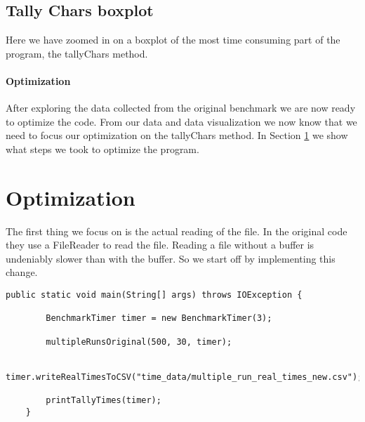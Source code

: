 \documentclass{article}
\begin{document}
\subsection*{Tally Chars boxplot}
Here we have zoomed in on a boxplot of the most time consuming part of the program, the tallyChars method. 


\paragraph{Optimization}
After exploring the data collected from the original benchmark we are now ready to optimize the code. 
From our data and data visualization we now know that we need to focus our optimization on the tallyChars method.
In Section \ref{optimization} we show what steps we took to optimize the program.

\section{Optimization} \label{optimization}
The first thing we focus on is the actual reading of the file. In the original code they use a FileReader to read the file.
Reading a file without a buffer is undeniably slower than with the buffer. So we start off by implementing this change. 

\begin{lstlisting}[caption={Change to BufferedReader}, label={lst:optimizationone}]
    public static void main(String[] args) throws IOException {
    
        BenchmarkTimer timer = new BenchmarkTimer(3);
    
        multipleRunsOriginal(500, 30, timer);
    
        timer.writeRealTimesToCSV("time_data/multiple_run_real_times_new.csv");
    
        printTallyTimes(timer);
    }
    \end{lstlisting} 
\end{document}

